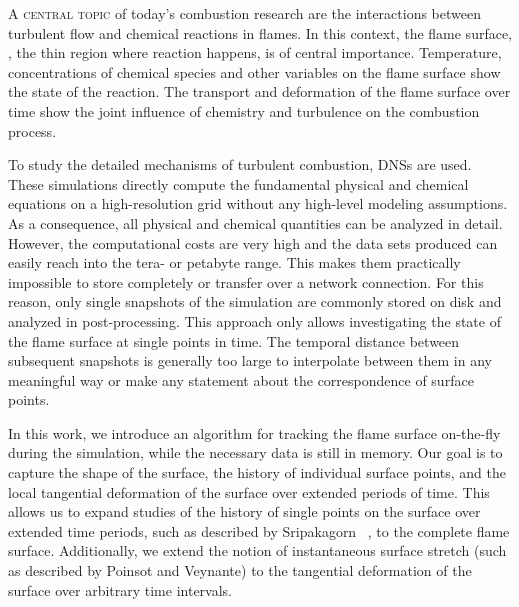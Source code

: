 %
\lettrine[lines=3, findent=-12pt, nindent=7pt, slope=7pt]{A}{ central topic} of today's combustion research are the interactions between
turbulent flow and chemical reactions in flames.
%
In this context, the flame surface, \ie, the thin region where reaction happens,
is of central importance.
%
Temperature, concentrations of chemical species and other variables on the flame
surface show the state of the reaction.
%
The transport and deformation of the flame surface over time show the joint
influence of chemistry and turbulence on the combustion process.
%

%
To study the detailed mechanisms of turbulent combustion, \acp{DNS} are used.
%
These simulations directly compute the fundamental physical and chemical
equations on a high-resolution grid without any high-level modeling assumptions.
%
As a consequence, all physical and chemical quantities can be analyzed in detail.
%
However, the computational costs are very high and the data sets produced can
easily reach into the tera- or petabyte range.
%
This makes them practically impossible to store completely or transfer over a
network connection.
%
For this reason, only single snapshots of the simulation are commonly stored
on disk and analyzed in post-processing.
%
This approach only allows investigating the state of the flame surface at single
points in time.
%
The temporal distance between subsequent snapshots is generally too large to
interpolate between them in any meaningful way or make any statement about
the correspondence of surface points.
%

%
In this work, we introduce an algorithm for tracking the flame surface
on-the-fly during the simulation, while the necessary data is still in memory.
%
Our goal is to capture the shape of the surface, the history of individual
surface points, and the local tangential deformation of the surface over
extended periods of time.
%
This allows us to expand studies of the history of single points on the surface
over extended time periods, such as described by Sripakagorn
\etal~\cite{Sripakagorn2004}, to the complete flame surface.
%
Additionally, we extend the notion of instantaneous surface stretch (such as
described by Poinsot and Veynante\cite{Poinsot2012}) to the tangential
deformation of the surface over arbitrary time intervals.
%

